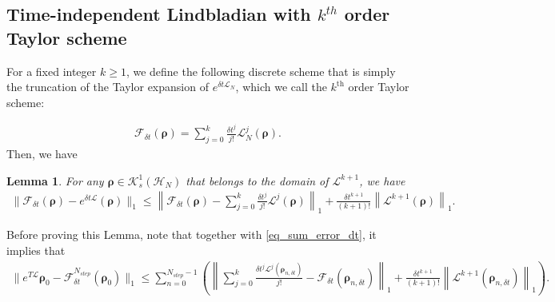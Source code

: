 \documentclass[a4paper,onecolumn,amsmath,amssymb,amsfonts,accepted=2026-03-06]{quantumarticle}
\newcommand{\xL}{\mathcal{L}}
\newcommand{\xH}{\mathcal{H}}
\newcommand{\xF}{\mathcal{F}}
\newcommand{\xK}{\mathcal{K}}
\newtheorem{lemma}{Lemma}
\begin{document}
\subsection{\texorpdfstring{Time-independent Lindbladian with $k^{th}$ order Taylor scheme}{Time-independent Lindbladian with kth order Taylor scheme}}

\label{paragraph:time_invariant_taylor}
For a fixed integer $k \geq 1$, we define the following discrete scheme that is simply the truncation of the Taylor expansion of $e^{\delta t \xL_N}$, which we call the $k^{\text{th}}$ order Taylor scheme:

\begin{align}
    \xF_{\delta t}(\boldsymbol{\rho})= \sum_{j=0}^{k} \frac{\delta t^j}{j!} \xL_N^j(\boldsymbol{\rho}).
\end{align}
Then, we have
\begin{lemma}
    \label{lemma_taylor}
    For any $\boldsymbol{\rho} \in \xK_s^1(\xH_N)$ that belongs to the domain of $\xL^{k+1}$, we have
    \begin{align}
        \|\xF_{\delta t}(\boldsymbol{\rho})-e^{\delta t \xL}(\boldsymbol{\rho})\|_1 \leq \left\|\xF_{\delta t}(\boldsymbol{\rho})- \sum_{j=0}^{k} \frac{\delta t^j}{j!}\xL^j(\boldsymbol{\rho})\right\|_1 + \frac{\delta t^{k+1}}{(k+1)!} \left\|\xL^{k+1}(\boldsymbol{\rho})\right\|_1.
    \end{align}
\end{lemma}
Before proving this Lemma, note that together with \cref{eq_sum_error_dt}, it implies that
\begin{align}
    \|e^{T\xL}\boldsymbol{\rho}_0- \xF^{N_{step}}_{\delta t}(\boldsymbol{\rho}_0)\|_1 \leq \sum_{n=0}^{N_{step}-1} \left( \left\|\sum_{j=0}^{k} \frac{\delta t^j \xL^j(\boldsymbol{\rho}_{n,\delta t})}{j!}-\xF_{\delta t}(\boldsymbol{\rho}_{n,\delta t})\right\|_1 + \frac{\delta t^{k+1}}{(k+1)!} \left\|\xL^{k+1}(\boldsymbol{\rho}_{n,\delta t})\right\|_1 \right) .
\end{align}
\end{document}
